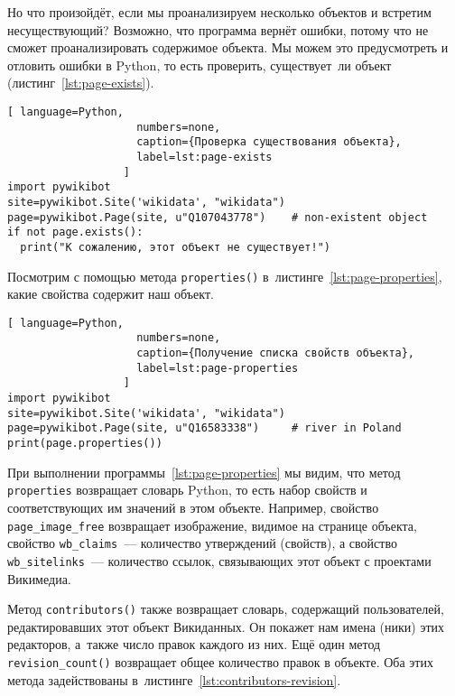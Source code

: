 Но что произойдёт, если мы проанализируем несколько объектов и встретим несуществующий? 
Возможно, что программа вернёт ошибки, потому что не сможет проанализировать содержимое объекта. 
Мы можем это предусмотреть и отловить ошибки в Python, то есть проверить, существует~ли объект (листинг~\ref{lst:page-exists}).

\begin{lstlisting}[ language=Python,
                    numbers=none,
                    caption={Проверка существования объекта},
                    label=lst:page-exists
                  ]
import pywikibot
site=pywikibot.Site('wikidata', "wikidata")
page=pywikibot.Page(site, u"Q107043778")    # non-existent object
if not page.exists():
  print("К сожалению, этот объект не существует!")
\end{lstlisting}


Посмотрим с помощью метода \lstinline|properties()| 
в~листинге~\ref{lst:page-properties}, 
какие свойства содержит наш объект.

\begin{lstlisting}[ language=Python,
                    numbers=none,
                    caption={Получение списка свойств объекта},
                    label=lst:page-properties
                  ]
import pywikibot
site=pywikibot.Site('wikidata', "wikidata")
page=pywikibot.Page(site, u"Q16583338")     # river in Poland
print(page.properties())
\end{lstlisting}

При выполнении программы~\ref{lst:page-properties} мы видим, что метод \lstinline|properties| 
возвращает словарь Python, то есть набор свойств и соответствующих им значений в этом объекте. 
Например, свойство \lstinline|page_image_free| возвращает изображение, видимое на странице объекта, 
свойство \lstinline|wb_claims|~--- количество утверждений (свойств), 
а свойство \lstinline|wb_sitelinks|~--- количество ссылок, связывающих этот объект с проектами Викимедиа.

Метод \lstinline|contributors()| также возвращает словарь, содержащий пользователей, 
редактировавших этот объект Викиданных. 
Он покажет нам имена (ники) этих редакторов, 
а~также число правок каждого из них. 
Ещё один метод \lstinline|revision_count()| возвращает общее количество правок в объекте. Оба этих метода задействованы в~листинге~\ref{lst:contributors-revision}.

